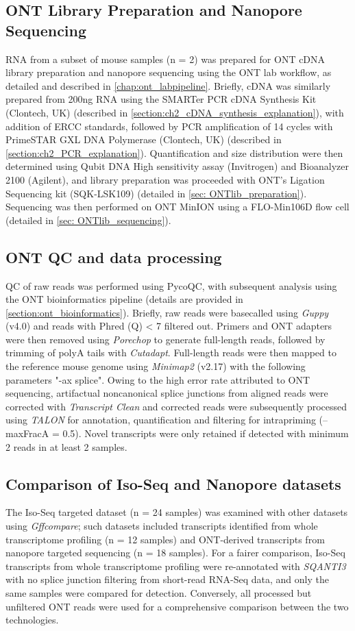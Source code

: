 \subsection{ONT Library Preparation and Nanopore Sequencing}
RNA from a subset of mouse samples (n = 2) was prepared for ONT cDNA library preparation and nanopore sequencing using the ONT lab workflow, as detailed and described in \cref{chap:ont_labpipeline}. Briefly, cDNA was similarly prepared from 200ng RNA using the SMARTer PCR cDNA Synthesis Kit (Clontech, UK) (described in \cref{section:ch2_cDNA_synthesis_explanation}), with addition of ERCC standards, followed by PCR amplification of 14 cycles with PrimeSTAR GXL DNA Polymerase (Clontech, UK) (described in \cref{section:ch2_PCR_explanation}). Quantification and size distribution were then determined using Qubit DNA High sensitivity assay (Invitrogen) and Bioanalyzer 2100 (Agilent), and library preparation was proceeded with ONT’s Ligation Sequencing kit (SQK-LSK109) (detailed in \cref{sec: ONTlib_preparation}). Sequencing was then performed on ONT MinION using a FLO-Min106D flow cell (detailed in \cref{sec: ONTlib_sequencing}). 

\subsection{ONT QC and data processing}
QC of raw reads was performed using PycoQC, with subsequent analysis using the ONT bioinformatics pipeline (details are provided in \cref{section:ont_bioinformatics}). Briefly, raw reads were basecalled using \textit{Guppy} (v4.0) and reads with Phred (Q) < 7 filtered out. Primers and ONT adapters were then removed using \textit{Porechop} to generate full-length reads, followed by trimming of polyA tails with \textit{Cutadapt}. Full-length reads were then mapped to the reference mouse genome using \textit{Minimap2} (v2.17) with the following parameters "-ax splice". Owing to the high error rate attributed to ONT sequencing, artifactual noncanonical splice junctions from aligned reads were corrected with \textit{Transcript Clean} and corrected reads were subsequently processed using \textit{TALON} for annotation, quantification and filtering for intrapriming (--maxFracA = 0.5). Novel transcripts were only retained if detected with minimum 2 reads in at least 2 samples. 
 
\subsection{Comparison of Iso-Seq and Nanopore datasets}
The Iso-Seq targeted dataset (n = 24 samples) was examined with other datasets using \textit{Gffcompare}; such datasets included transcripts identified from whole transcriptome profiling (n = 12 samples) and ONT-derived transcripts from nanopore targeted sequencing (n = 18 samples). For a fairer comparison, Iso-Seq transcripts from whole transcriptome profiling were re-annotated with \textit{SQANTI3} with no splice junction filtering from short-read RNA-Seq data, and only the same samples were compared for detection. Conversely, all processed but unfiltered ONT reads were used for a comprehensive comparison between the two technologies.   

